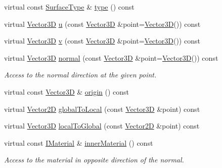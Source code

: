 \begin{DoxyCompactItemize}
virtual const \hyperlink{class_d_d_surfaces_1_1_surface_type}{Surface\+Type} \& \hyperlink{class_d_d4hep_1_1_d_d_rec_1_1_vol_surface_base_aa59d5b3c519424448db12c015a95b760}{type} () const
\item 
virtual \hyperlink{class_d_d_surfaces_1_1_vector3_d}{Vector3D} \hyperlink{class_d_d4hep_1_1_d_d_rec_1_1_vol_surface_base_a4eb22902d5caf992589142a93accc48d}{u} (const \hyperlink{class_d_d_surfaces_1_1_vector3_d}{Vector3D} \&point=\hyperlink{class_d_d_surfaces_1_1_vector3_d}{Vector3D}()) const
\item 
virtual \hyperlink{class_d_d_surfaces_1_1_vector3_d}{Vector3D} \hyperlink{class_d_d4hep_1_1_d_d_rec_1_1_vol_surface_base_a94d4f190a803d08a9739fb31a8c6fd2f}{v} (const \hyperlink{class_d_d_surfaces_1_1_vector3_d}{Vector3D} \&point=\hyperlink{class_d_d_surfaces_1_1_vector3_d}{Vector3D}()) const
\item 
virtual \hyperlink{class_d_d_surfaces_1_1_vector3_d}{Vector3D} \hyperlink{class_d_d4hep_1_1_d_d_rec_1_1_vol_surface_base_a247a1503e7265c3a9e4a6a17df2c58e4}{normal} (const \hyperlink{class_d_d_surfaces_1_1_vector3_d}{Vector3D} \&point=\hyperlink{class_d_d_surfaces_1_1_vector3_d}{Vector3D}()) const
\begin{DoxyCompactList}\small\item\em Access to the normal direction at the given point. \end{DoxyCompactList}\item 
virtual const \hyperlink{class_d_d_surfaces_1_1_vector3_d}{Vector3D} \& \hyperlink{class_d_d4hep_1_1_d_d_rec_1_1_vol_surface_base_a057675c3f4a66116703a467df8c348fe}{origin} () const
\item 
virtual \hyperlink{class_d_d_surfaces_1_1_vector2_d}{Vector2D} \hyperlink{class_d_d4hep_1_1_d_d_rec_1_1_vol_surface_base_a9f2549dc5b7d2fbf58d1ef8c6699b49f}{global\+To\+Local} (const \hyperlink{class_d_d_surfaces_1_1_vector3_d}{Vector3D} \&point) const
\item 
virtual \hyperlink{class_d_d_surfaces_1_1_vector3_d}{Vector3D} \hyperlink{class_d_d4hep_1_1_d_d_rec_1_1_vol_surface_base_a9cf248895aeb84a7e2cd2b2068661397}{local\+To\+Global} (const \hyperlink{class_d_d_surfaces_1_1_vector2_d}{Vector2D} \&point) const
\item 
virtual const \hyperlink{class_d_d_surfaces_1_1_i_material}{I\+Material} \& \hyperlink{class_d_d4hep_1_1_d_d_rec_1_1_vol_surface_base_ab963afedcbd258aa996223abe1e065bb}{inner\+Material} () const
\begin{DoxyCompactList}\small\item\em Access to the material in opposite direction of the normal. \end{DoxyCompactList}\item 

\end{DoxyCompactItemize}
